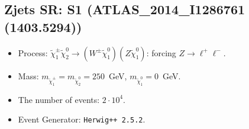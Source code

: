 \documentclass[12pt]{article}
\begin{document}
    
\subsection{Zjets SR: S1 (ATLAS\_2014\_I1286761 (1403.5294))} 


        \begin{itemize}
        \item  Process: $\tilde \chi_1^\pm \tilde \chi_2^0 \to (W^\pm \tilde \chi_1^0) (Z \tilde \chi_1^0)$: forcing $Z \to \ell^+ \ell^-$.
        \item  Mass: $m_{\tilde \chi_1^\pm} = m_{\tilde \chi_2^0} = 250$~GeV, $m_{\tilde \chi_1^0} = 0$~GeV.
        \item  The number of events: $2 \cdot 10^4$.
        \item  Event Generator: {\tt Herwig++ 2.5.2}.    
        \end{itemize}    
    
\end{document}
